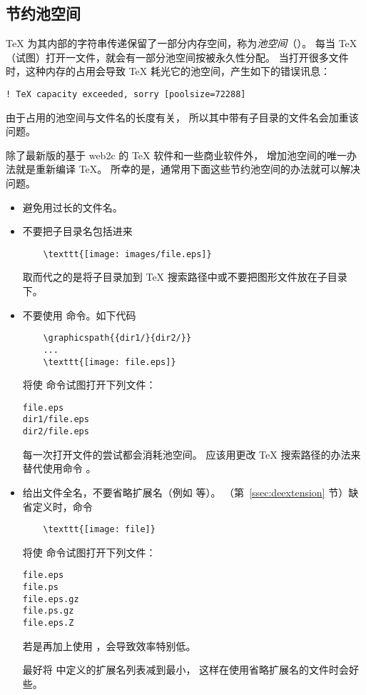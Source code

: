 \subsection{节约池空间}\label{ssec:poolspace}

\TeX{} 为其内部的字符串传递保留了一部分内存空间，称为\emph{池空间}（）。
每当 \TeX{} （试图）打开一文件，就会有一部分池空间按被永久性分配。
当打开很多文件时，这种内存的占用会导致 \TeX{} 耗光它的池空间，产生如下的错误讯息：
\begin{Verbatim}[xleftmargin=1cm]
! TeX capacity exceeded, sorry [poolsize=72288]
\end{Verbatim}

由于占用的池空间与文件名的长度有关，
所以其中带有子目录的文件名会加重该问题。

除了最新版的基于 web2c 的 \TeX{} 软件和一些商业软件外，
增加池空间的唯一办法就是重新编译 \TeX{}。
所幸的是，通常用下面这些节约池空间的办法就可以解决问题。

\begin{itemize}
\item 避免用过长的文件名。

\item 不要把子目录名包括进来
	\begin{lstlisting}
	\texttt{[image: images/file.eps]}
	\end{lstlisting}
	取而代之的是将子目录加到 \TeX{} 搜索路径中或不要把图形文件放在子目录下。
	
\item 不要使用  命令。如下代码
	\begin{lstlisting}
	\graphicspath{{dir1/}{dir2/}}
	...
	\texttt{[image: file.eps]}
	\end{lstlisting}
	将使  命令试图打开下列文件：
\begin{Verbatim}[xleftmargin=1.5cm]
file.eps
dir1/file.eps
dir2/file.eps
\end{Verbatim}
	每一次打开文件的尝试都会消耗池空间。
	应该用更改 \TeX{} 搜索路径的办法来替代使用命令 。
	
\item 给出文件全名，不要省略扩展名（例如  等）。
	 （第~\ref{ssec:deextension} 节）缺省定义时，命令
	\begin{lstlisting}
	\texttt{[image: file]}
	\end{lstlisting}
	将使  命令试图打开下列文件：
\begin{Verbatim}[xleftmargin=1.5cm]
file.eps
file.ps
file.eps.gz
file.ps.gz
file.eps.Z
\end{Verbatim}
	若是再加上使用 ，会导致效率特别低。
	
	最好将  中定义的扩展名列表减到最小，
	这样在使用省略扩展名的文件时会好些。
\end{itemize}


